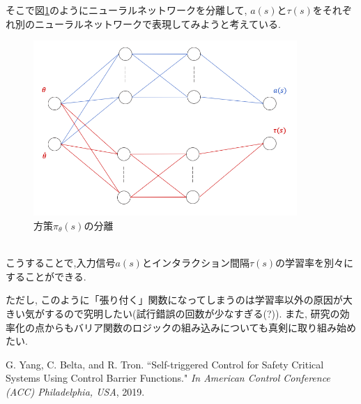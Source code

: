 \documentclass{jsarticle}
\begin{document}
そこで図\ref{split_NN}のようにニューラルネットワークを分離して, $a(s)と\tau(s)$をそれぞれ別のニューラルネットワークで表現してみようと考えている.
\begin{figure}[h]
	\centering
 	\includegraphics[width=10cm]{split_NN.png}
 	\caption{方策$\pi_{\theta}(s)$の分離}  \label{split_NN}
\end{figure}\\
こうすることで,入力信号$a(s)$とインタラクション間隔$\tau(s)$の学習率を別々にすることができる.\par
ただし, このように「張り付く」関数になってしまうのは学習率以外の原因が大きい気がするので究明したい(試行錯誤の回数が少なすぎる(?)). また, 研究の効率化の点からもバリア関数のロジックの組み込みについても真剣に取り組み始めたい.


\begin{thebibliography}{10}
G. Yang, C. Belta, and R. Tron. “Self-triggered Control for Safety Critical Systems Using Control Barrier Functions."  \textit{In American Control Conference (ACC) Philadelphia, USA}, 2019.
 
 \end{thebibliography}
\end{document}
